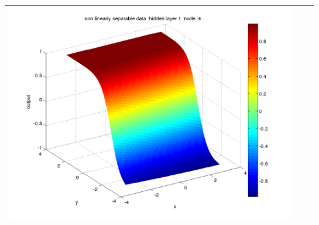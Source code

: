 \documentclass[fleqn]{article}
\begin{document}
\begin{center}
\begin{longtable}{ c | c | r  }
    \includegraphics[scale=0.25]{./pics/nonlinearlyseparable/_4_2/_4_2_epoch_100_hidden layer 1 :4} &  & \\ 
    \hline
  \end{longtable}
\end{center}
\end{document}
